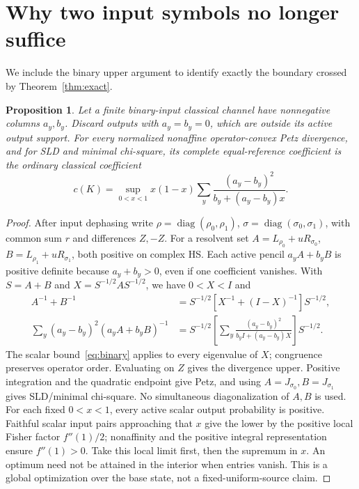 \documentclass[11pt]{article}
\newtheorem{proposition}[theorem]{Proposition}
\theoremstyle{remark}\newtheorem{remark}[theorem]{Remark}
\newcommand{\diag}{\operatorname{diag}}
\begin{document}
\section{Why two input symbols no longer suffice}
We include the binary upper argument to identify exactly the boundary crossed by Theorem~\ref{thm:exact}.
\begin{proposition}\label{prop:binary}
Let a finite binary-input classical channel have nonnegative columns $a_y,b_y$. Discard outputs with $a_y=b_y=0$, which are outside its active output support. For every normalized nonaffine operator-convex Petz divergence, and for SLD and minimal chi-square, its complete equal-reference coefficient is the ordinary classical coefficient
\begin{equation}\label{eq:binary}
 c(K)=\sup_{0<x<1}x(1-x)\sum_y
 \frac{(a_y-b_y)^2}{b_y+(a_y-b_y)x}.
\end{equation}
\end{proposition}
\begin{proof}
After input dephasing write $\rho=\diag(\rho_0,\rho_1)$, $\sigma=\diag(\sigma_0,\sigma_1)$, with common sum $r$ and differences $Z,-Z$. For a resolvent set $A=L_{\rho_0}+uR_{\sigma_0}$, $B=L_{\rho_1}+uR_{\sigma_1}$, both positive on complex HS. Each active pencil $a_yA+b_yB$ is positive definite because $a_y+b_y>0$, even if one coefficient vanishes. With $S=A+B$ and $X=S^{-1/2}AS^{-1/2}$, we have $0<X<I$ and
\begin{align*}
 A^{-1}+B^{-1}&=S^{-1/2}[X^{-1}+(I-X)^{-1}]S^{-1/2},\\
 \sum_y(a_y-b_y)^2(a_yA+b_yB)^{-1}
 &=S^{-1/2}\left[\sum_y\frac{(a_y-b_y)^2}
 {b_yI+(a_y-b_y)X}\right]S^{-1/2}.
\end{align*}
The scalar bound~\eqref{eq:binary} applies to every eigenvalue of $X$; congruence preserves operator order. Evaluating on $Z$ gives the divergence upper. Positive integration and the quadratic endpoint give Petz, and using $A=J_{\sigma_0},B=J_{\sigma_1}$ gives SLD/minimal chi-square. No simultaneous diagonalization of $A,B$ is used. For each fixed $0<x<1$, every active scalar output probability is positive. Faithful scalar input pairs approaching that $x$ give the lower by the positive local Fisher factor $f''(1)/2$; nonaffinity and the positive integral representation ensure $f''(1)>0$. Take this local limit first, then the supremum in $x$. An optimum need not be attained in the interior when entries vanish. This is a global optimization over the base state, not a fixed-uniform-source claim.
\end{proof}
\end{document}
